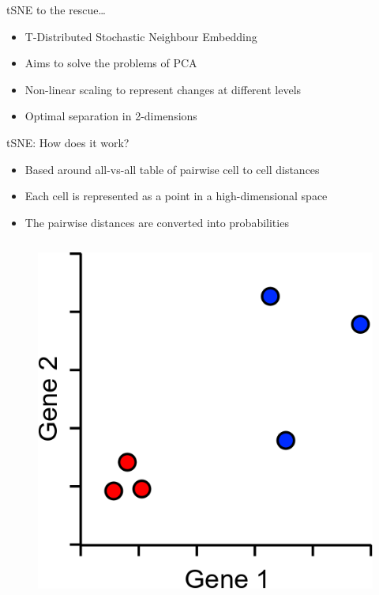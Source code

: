 \begin{frame}[allowframebreaks]{tSNE to the rescue\dots}
    \begin{itemize}
        \item T-Distributed Stochastic Neighbour Embedding
        \item Aims to solve the problems of PCA
        \item Non-linear scaling to represent changes at different levels
        \item Optimal separation in 2-dimensions
    \end{itemize}
\end{frame}

\begin{frame}[allowframebreaks]{tSNE: How does it work?}
    \begin{itemize}
        \item Based around all-vs-all table of pairwise cell to cell distances
        \item Each cell is represented as a point in a high-dimensional space
        \item The pairwise distances are converted into probabilities
    \end{itemize}
    \vspace{1em}
    \begin{columns}
        \begin{column}{0.33\textwidth}
            \begin{figure}
                \centering
                \includegraphics[width=1\textwidth,keepaspectratio]{images/dul/dim-reduce/tsne-points.png}

\end{figure}
\end{column}
\end{columns}
\end{frame}
